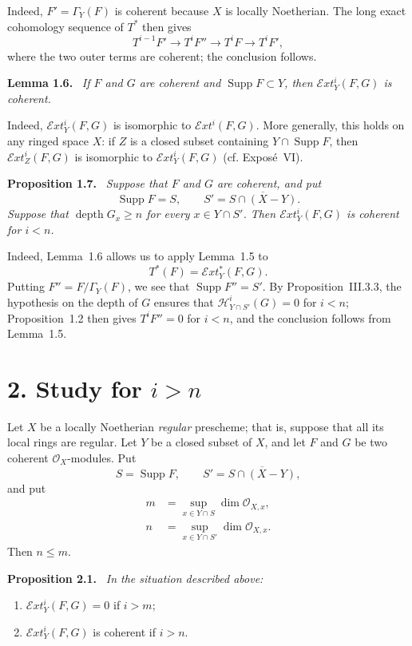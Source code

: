 \documentclass[11pt,a4paper]{article}
\newcommand{\OX}{\mathcal O_X}
\newcommand{\Oo}{\mathcal O}
\newcommand{\SheafExt}{\mathcal E\!xt}
\newcommand{\SheafH}{\mathcal H}
\newcommand{\Supp}{\operatorname{Supp}}
\newcommand{\depthop}{\operatorname{depth}}
\newenvironment{sgastatement}[1]{\par\addvspace{0.8\baselineskip}\noindent\textbf{#1.}\ \itshape}{\par}
\begin{document}
Indeed, $F'=\Gamma_Y(F)$ is coherent because $X$ is locally Noetherian. The
long exact cohomology sequence of $T^{\ast}$ then gives
\[
  T^{i-1}F'\longrightarrow T^iF''\longrightarrow T^iF
  \longrightarrow T^iF',
\]
where the two outer terms are coherent; the conclusion follows.

\begin{sgastatement}{Lemma 1.6}
If $F$ and $G$ are coherent and $\Supp F\subset Y$, then
$\SheafExt_Y^i(F,G)$ is coherent.
\end{sgastatement}

Indeed, $\SheafExt_Y^i(F,G)$ is isomorphic to $\SheafExt^i(F,G)$. More
generally, this holds on any ringed space $X$: if $Z$ is a closed subset
containing $Y\cap\Supp F$, then $\SheafExt_Z^i(F,G)$ is isomorphic to
$\SheafExt_Y^i(F,G)$ (cf. Expos\'e~VI).

\begin{sgastatement}{Proposition 1.7}
Suppose that $F$ and $G$ are coherent, and put
\[
  \Supp F=S,\qquad S'=\overline{S\cap(X-Y)}.
\]
Suppose that $\depthop G_x\geq n$ for every $x\in Y\cap S'$. Then
$\SheafExt_Y^i(F,G)$ is coherent for $i<n$.
\end{sgastatement}

Indeed, Lemma~1.6 allows us to apply Lemma~1.5 to
\[
  T^{\ast}(F)=\SheafExt_Y^{\ast}(F,G).
\]
Putting $F''=F/\Gamma_Y(F)$, we see that $\Supp F''=S'$. By
Proposition~III.3.3, the hypothesis on the depth of $G$ ensures that
$\SheafH^i_{Y\cap S'}(G)=0$ for $i<n$; Proposition~1.2 then gives
$T^iF''=0$ for $i<n$, and the conclusion follows from Lemma~1.5.

\section*{2. Study for $i>n$}

Let $X$ be a locally Noetherian \emph{regular} prescheme; that is, suppose that
all its local rings are regular. Let $Y$ be a closed subset of $X$, and let
$F$ and $G$ be two coherent $\OX$-modules. Put
\[
  S=\Supp F,\qquad S'=\overline{S\cap(X-Y)},
\]
and put
\begin{align*}
  m&=\sup_{x\in Y\cap S}\dim\Oo_{X,x},\\
  n&=\sup_{x\in Y\cap S'}\dim\Oo_{X,x}.
\end{align*}
Then $n\leq m$.

\begin{sgastatement}{Proposition 2.1}
In the situation described above:
\begin{enumerate}
\item $\SheafExt_Y^i(F,G)=0$ if $i>m$;
\item $\SheafExt_Y^i(F,G)$ is coherent if $i>n$.
\end{enumerate}
\end{sgastatement}
\end{document}
